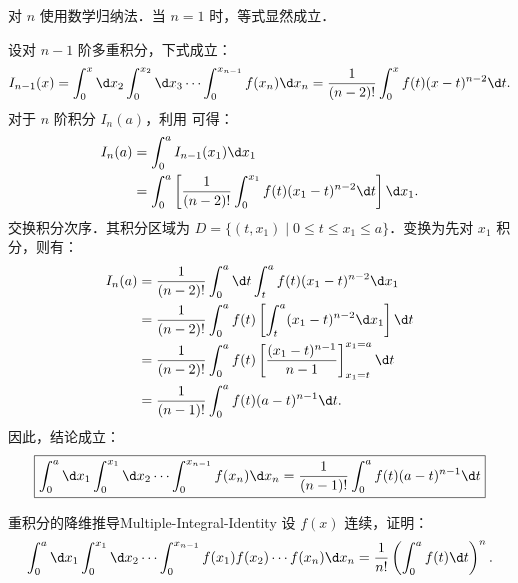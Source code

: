 \begin{myproof}
    对 $n$ 使用数学归纳法．当 $n=1$ 时，等式显然成立．

    设对 $n-1$ 阶多重积分，下式成立：
    \begin{equation}
        \label{eq:Induction-Hypothesis}
        I_{n-1}(x) = \int_{0}^{x} \d x_2 \int_{0}^{x_2} \d x_3 \cdots \int_{0}^{x_{n-1}} f(x_n) \d x_n = \frac{1}{(n-2)!} \int_{0}^{x} f(t)(x-t)^{n-2} \d t.
    \end{equation}
    对于 $n$ 阶积分 $I_n(a)$，利用  可得：
    \begin{equation}
        \begin{aligned}
            I_n(a) & = \int_{0}^{a} I_{n-1}(x_1) \d x_1                                                           \\
                   & = \int_{0}^{a} \left[ \frac{1}{(n-2)!} \int_{0}^{x_1} f(t)(x_1-t)^{n-2} \d t \right] \d x_1.
        \end{aligned}
    \end{equation}
    交换积分次序．其积分区域为 $D = \{ (t, x_1) \mid 0 \le t \le x_1 \le a \}$．变换为先对 $x_1$ 积分，则有：
    \begin{equation}
        \begin{aligned}
            I_n(a) & = \frac{1}{(n-2)!} \int_{0}^{a} \d t \int_{t}^{a} f(t)(x_1-t)^{n-2} \d x_1                         \\
                   & = \frac{1}{(n-2)!} \int_{0}^{a} f(t) \left[ \int_{t}^{a} (x_1-t)^{n-2} \d x_1 \right] \d t         \\
                   & = \frac{1}{(n-2)!} \int_{0}^{a} f(t) \left[ \frac{(x_1-t)^{n-1}}{n-1} \right]_{x_1=t}^{x_1=a} \d t \\
                   & = \frac{1}{(n-1)!} \int_{0}^{a} f(t)(a-t)^{n-1} \d t.
        \end{aligned}
    \end{equation}
    因此，结论成立：
    \begin{equation}
        \boxed{ \int_{0}^{a} \d x_1 \int_{0}^{x_1} \d x_2 \cdots \int_{0}^{x_{n-1}} f(x_n) \d x_n = \frac{1}{(n-1)!} \int_{0}^{a} f(t)(a-t)^{n-1} \d t }
    \end{equation}
\end{myproof}

\begin{problem}{重积分的降维推导}{Multiple-Integral-Identity}
    设 $f(x)$ 连续，证明：
    \begin{equation}
        \int_{0}^{a} \d x_{1} \int_{0}^{x_{1}} \d x_{2} \cdots \int_{0}^{x_{n-1}} f(x_{1}) f(x_{2}) \cdots f(x_{n}) \d x_{n} = \frac{1}{n!} \left( \int_{0}^{a} f(t) \d t \right)^{n}.
    \end{equation}
\end{problem}


